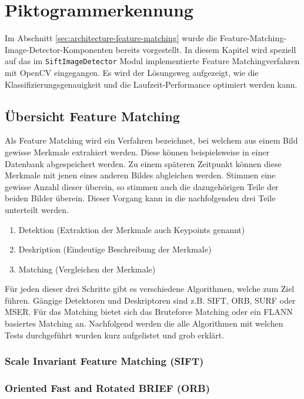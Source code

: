 \section{Piktogrammerkennung}
Im Abschnitt \ref{sec:architecture-feature-matching} wurde die Feature-Matching-Image-Detector-Komponenten bereits vorgestellt. In diesem Kapitel wird speziell auf das im \texttt{SiftImageDetector} Modul implementierte Feature Matchingverfahren mit OpenCV eingegangen. Es wird der Lösungsweg aufgezeigt, wie die Klassifizierungsgenauigkeit und die Laufzeit-Performance optimiert werden kann.

\subsection{Übersicht Feature Matching}
Als Feature Matching wird ein Verfahren bezeichnet, bei welchem aus einem Bild gewisse Merkmale extrahiert werden. Diese können beispielsweise in einer Datenbank abgespeichert werden. Zu einem späteren Zeitpunkt können diese Merkmale mit jenen eines anderen Bildes abgleichen werden. Stimmen eine gewisse Anzahl dieser überein, so stimmen auch die dazugehörigen Teile der beiden Bilder überein. Dieser Vorgang kann in die nachfolgenden drei Teile unterteilt werden.

\begin{enumerate}
    \item Detektion (Extraktion der Merkmale auch Keypoints genannt)
    \item Deskription (Eindeutige Beschreibung der Merkmale)
    \item Matching (Vergleichen der Merkmale)
\end{enumerate}

Für jeden dieser drei Schritte gibt es verschiedene Algorithmen, welche zum Ziel führen. Gängige Detektoren und Deskriptoren sind z.B. SIFT, ORB, SURF oder MSER. Für das Matching bietet sich das Bruteforce Matching oder ein FLANN basiertes Matching an. Nachfolgend werden die alle Algorithmen mit welchen Tests durchgeführt wurden kurz aufgelistet und grob erklärt.

\subsubsection{Scale Invariant Feature Matching (SIFT)}

\subsubsection{Oriented Fast and Rotated BRIEF (ORB)}


